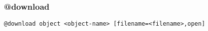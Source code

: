 \subsubsection{@download}
\label{download}

\begin{verbatim}
@download object <object-name> [filename=<filename>,open]
\end{verbatim}